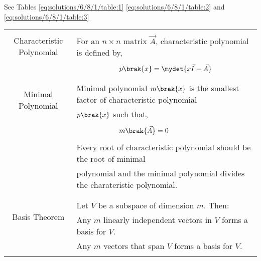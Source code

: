 See Tables \ref{eq:solutions/6/8/1/table:1} 
 \ref{eq:solutions/6/8/1/table:2}
and \ref{eq:solutions/6/8/1/table:3}


\begin{table*}[ht!]
\centering
\begin{tabular}{|c|l|}
    \hline
	\multirow{3}{*}{Characteristic Polynomial} 
	& \\
	& For an $n\times n$ matrix $\vec{A}$, characteristic polynomial is defined by,\\
	&\\
	& $\qquad\qquad\qquad p\brak{x}=\mydet{x\Vec{I}-\Vec{A}}$\\
	&\\
	\hline
	\multirow{3}{*}{Minimal Polynomial} 
	&\\
	& Minimal polynomial $m\brak{x}$ is the smallest factor of characteristic polynomial\\
	& $p\brak{x}$ such that,\\
	&\\
	& $\qquad \qquad \qquad m\brak{\vec{A}}=0$\\
	& \\
	& Every root of characteristic polynomial should be the root of minimal\\
	& polynomial and the minimal polynomial divides the charateristic polynomial.\\
	&\\
	\hline
	\multirow{3}{*}{Basis Theorem} 
	&\\
	& Let $V$ be a subspace of dimension $m$. Then:\\
	& Any $m$ linearly independent vectors in $V$ forms a basis for $V$.\\
	& Any $m$ vectors that span $V$ forms a basis for $V$.\\
	&\\
    \hline
\end{tabular}
    \caption{Definitions}
\label{eq:solutions/6/8/1/table:1}
\end{table*}
\onecolumn
